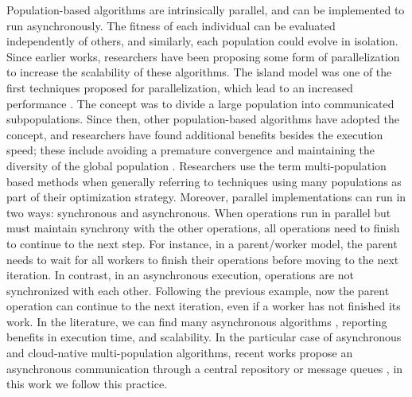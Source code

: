 \documentclass[review]{elsarticle}
\begin{document}
Population-based algorithms are intrinsically parallel, and can be implemented to run asynchronously.
The fitness of each individual can be evaluated independently of 
others, and similarly, each population could evolve in isolation. Since 
earlier works, researchers have been proposing some form of parallelization
\cite{muhlenbein1988evolution} to increase the scalability of these algorithms.
The island model was one of the first techniques proposed for parallelization,
which lead to an increased performance \cite{gorges1990explicit,grosso1985computer}. 
The concept was to divide a large population into communicated subpopulations. 
Since then, other population-based algorithms have adopted the concept, 
and researchers have found additional benefits
besides the execution speed; these include avoiding a premature convergence and
maintaining the diversity of the global population \cite{li2015multi}. Researchers use the term
multi-population based methods when generally referring to techniques using
many populations as part of their optimization strategy. %
Moreover, parallel implementations can run in two ways: synchronous and
asynchronous. When operations run in parallel but must maintain synchrony with
the other operations,  all operations need to finish to continue to the next
step. For instance, in a  parent/worker model, the parent needs to wait for all
workers to finish their operations before moving to the next iteration.  In
contrast, in an asynchronous execution,  operations are not synchronized with
each other. Following the previous example, now the parent operation can
continue to the next iteration, even if a worker has not finished its work.  In
the literature, we can find many asynchronous algorithms
\cite{coleman89,baugh2003asynchronous}, reporting benefits in execution time,
and scalability. In the particular case of asynchronous and cloud-native
multi-population algorithms, recent works propose an asynchronous communication
through a central repository \cite{sofea:cec2012, JSON} or message queues
\cite{salza2019speed, guervos2018introducing}, in this work we follow this
practice.
\end{document}
